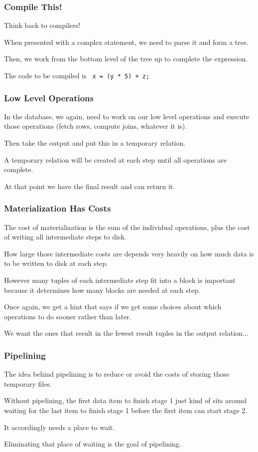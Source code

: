 \begin{frame}
\frametitle{Compile This!}

Think back to compilers!

When presented with a complex statement, we need to parse it and form a tree. 

Then, we work from the bottom level of the tree up to complete the expression. 

The code to be compiled is \texttt{ x = (y * 5) + z; }

\end{frame}

\begin{frame}
\frametitle{Low Level Operations}
In the database, we again, need to work on our low level operations and execute those operations (fetch rows, compute joins, whatever it is).

Then take the output and put this in a temporary relation. 

A temporary relation will be created at each step until all operations are complete. 

At that point we have the final result and can return it. 


\end{frame}

\begin{frame}
\frametitle{Materialization Has Costs}
The cost of materialization is the sum of the individual operations, plus the cost of writing all intermediate steps to disk. 

How large those intermediate costs are depends very heavily on how much data is to be written to disk at each step. 

However many tuples of each intermediate step fit into a block is important because it determines how many blocks are needed at each step. 

Once again, we get a hint that says if we get some choices about which operations to do sooner rather than later.

We want the ones that result in the fewest result tuples in the output relation...


\end{frame}

\begin{frame}
\frametitle{Pipelining}

The idea behind pipelining is to reduce or avoid the costs of storing those temporary files. 

Without pipelining, the first data item to finish stage 1 just kind of sits around waiting for the last item to finish stage 1 before the first item can start stage 2. 

It accordingly needs a place to wait. 

Eliminating that place of waiting is the goal of pipelining.

\end{frame}

